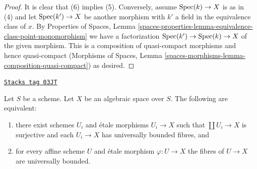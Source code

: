 \begin{proof}
\medskip\noindent
It is clear that (6) implies (5). Conversely, assume $\operatorname{Spec}(k) \to X$ is
as in (4) and let $\operatorname{Spec}(k') \to X$ be another morphism with $k'$ a
field in the equivalence class of $x$. By
Properties of Spaces, Lemma
\ref{spaces-properties-lemma-equivalence-class-point-monomorphism}
we have a factorization $\operatorname{Spec}(k') \to \operatorname{Spec}(k) \to X$ of the
given morphism. This is a composition of quasi-compact
morphisms and hence quasi-compact (Morphisms of Spaces,
Lemma \ref{spaces-morphisms-lemma-composition-quasi-compact}) as desired.
\end{proof}

\begin{lemma}
\label{decent-spaces-lemma-U-universally-bounded}
\href{https://stacks.math.columbia.edu/tag/03JT}{\texttt{Stacks tag 03JT}}

Let $S$ be a scheme. Let $X$ be an algebraic space over $S$.
The following are equivalent:
\begin{enumerate}
\item there exist schemes $U_i$ and \'etale morphisms
$U_i \to X$ such that $\coprod U_i \to X$ is surjective and
each $U_i \to X$ has universally bounded fibres, and
\item for every affine scheme $U$ and \'etale morphism $\varphi : U \to X$
the fibres of $U \to X$ are universally bounded.
\end{enumerate}
\end{lemma}

